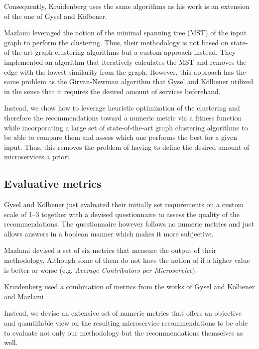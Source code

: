 \documentclass[12pt,a4paper]{report}
\begin{document}
Consequently, Kruidenberg \cite{kruidenberg2018monoliths} uses the same
algorithms as his work is an extension of the one of Gysel and K{\"o}lbener.

Mazlami \cite{mazlami2017extraction} leveraged the notion of the
minimal spanning tree (MST) of the input graph to perform the clustering.
Thus, their methodology is not based on state-of-the-art graph clustering algorithms
but a custom approach instead. They implemented an algorithm
that iteratively calculates the MST and removes the edge with the lowest similarity
from the graph. However, this approach has the same problem as the
Girvan-Newman algorithm \cite{girvan2002community} that Gysel and K{\"o}lbener
utilized in the sense that it requires the desired amount of services beforehand.

Instead, we show how to leverage heuristic optimization of the clustering and
therefore the recommendations toward a numeric metric via a fitness function
while incorporating a large set of state-of-the-art graph clustering algorithms
to be able to compare them and assess which one performs the best for a given input.
Thus, this removes the problem of having to define the desired amount of microservices
a priori.


\subsection{Evaluative metrics}

Gysel and K{\"o}lbener \cite{gysel2016service} just evaluated their
initially set requirements on a custom scale of 1--3 together with a devised
questionnaire to assess the quality of the recommendations.
The questionnaire however follows no numeric metrics and just allows answers
in a boolean manner which makes it more subjective.

Mazlami \cite{mazlami2017extraction} devised a set of six metrics that measure
the output of their methodology. Although some of them do not have the notion
of if a higher value is better or worse (e.g. \textit{Average Contributors per Microservice}).

Kruidenberg \cite{kruidenberg2018monoliths} used a combination of metrics from
the works of Gysel and K{\"o}lbener \cite{gysel2016service} and
Mazlami \cite{mazlami2017extraction}.

Instead, we devise an extensive set of numeric metrics that offers
an objective and quantifiable view on the resulting microservice recommendations
to be able to evaluate not only our methodology but the recommendations themselves as well.
\end{document}
